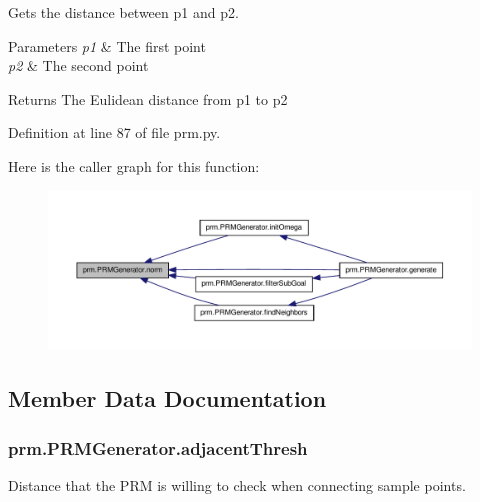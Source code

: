 Gets the distance between p1 and p2. 


\begin{DoxyParams}{Parameters}
{\em p1} & The first point \\
\hline
{\em p2} & The second point \\
\hline
\end{DoxyParams}
\begin{DoxyReturn}{Returns}
The Eulidean distance from p1 to p2 
\end{DoxyReturn}


Definition at line 87 of file prm.\-py.



Here is the caller graph for this function\-:
\nopagebreak
\begin{figure}[H]
\begin{center}
\leavevmode
\includegraphics[width=350pt]{classprm_1_1PRMGenerator_a652b3c0fa11645f351c23635d7e62dda_icgraph}
\end{center}
\end{figure}




\subsection{Member Data Documentation}
\hypertarget{classprm_1_1PRMGenerator_aa56ad4365534ffed0b4311c5accce577}{
\subsubsection[{adjacent\-Thresh}]{\setlength{\rightskip}{0pt plus 5cm}prm.\-P\-R\-M\-Generator.\-adjacent\-Thresh}}\label{classprm_1_1PRMGenerator_aa56ad4365534ffed0b4311c5accce577}


Distance that the P\-R\-M is willing to check when connecting sample points. 



